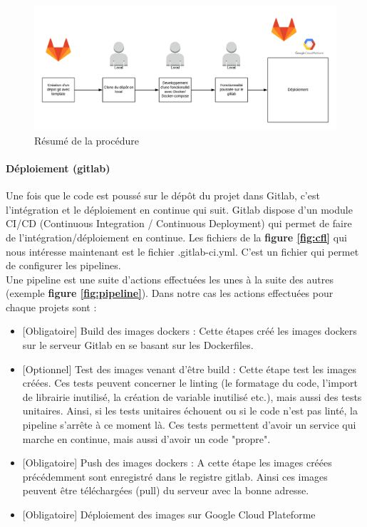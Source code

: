 \documentclass{article} %
\begin{document}
\begin{figure}[!h]
	\centering
	\includegraphics[keepaspectratio = true,scale=0.6]{resume.png}
	\caption{Résumé de la procédure}
	\label{fig:ress}
\end{figure}


\paragraph{Déploiement (gitlab)\\}
Une fois que le code est poussé sur le dépôt du projet dans Gitlab, c'est l'intégration et le déploiement en continue qui suit. Gitlab dispose d'un module CI/CD (Continuous Integration / Continuous Deployment) qui permet de faire de l'intégration/déploiement en continue. Les fichiers de la \textbf{figure \ref{fig:cfl}} qui nous intéresse maintenant est le fichier .gitlab-ci.yml. C'est un fichier qui permet de configurer les pipelines.\\
Une pipeline est une suite d'actions effectuées les unes à la suite des autres (exemple \textbf{figure \ref{fig:pipeline}}). Dans notre cas les actions effectuées pour chaque projets sont : 
\begin{itemize}
	\item {[Obligatoire]} Build des images dockers : Cette étapes créé les images dockers sur le serveur Gitlab en se basant sur les Dockerfiles.
	\item {[Optionnel]} Test des images venant d'être build : Cette étape test les images créées. Ces tests peuvent concerner le linting (le formatage du code, l'import de librairie inutilisé, la création de variable inutilisé etc.), mais aussi des tests unitaires. Ainsi, si les tests unitaires échouent ou si le code n'est pas linté, la pipeline s'arrête à ce moment là. Ces tests permettent d'avoir un service qui marche en continue, mais aussi d'avoir un code "propre".
	\item {[Obligatoire]} Push des images dockers : A cette étape les images créées précédemment sont enregistré dans le registre gitlab. Ainsi ces images peuvent être téléchargées (pull) du serveur avec la bonne adresse. 
	\item {[Obligatoire]} Déploiement des images sur Google Cloud Plateforme	
\end{itemize}
\end{document}
